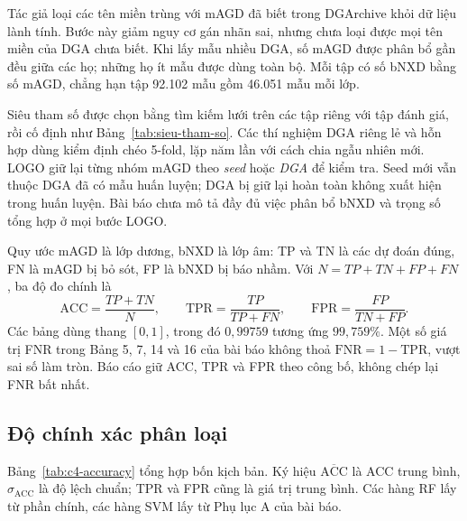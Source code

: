 Tác giả loại các tên miền trùng với mAGD đã biết trong DGArchive khỏi dữ liệu lành tính. Bước này giảm nguy cơ gán nhãn sai, nhưng chưa loại được mọi tên miền của DGA chưa biết. Khi lấy mẫu nhiều DGA, số mAGD được phân bổ gần đều giữa các họ; những họ ít mẫu được dùng toàn bộ. Mỗi tập có số bNXD bằng số mAGD, chẳng hạn tập 92.102 mẫu gồm 46.051 mẫu mỗi lớp.

Siêu tham số được chọn bằng tìm kiếm lưới trên các tập riêng với tập đánh giá, rồi cố định như Bảng~\ref{tab:sieu-tham-so}. Các thí nghiệm DGA riêng lẻ và hỗn hợp dùng kiểm định chéo 5-fold, lặp năm lần với cách chia ngẫu nhiên mới. LOGO giữ lại từng nhóm mAGD theo \emph{seed} hoặc \emph{DGA} để kiểm tra. Seed mới vẫn thuộc DGA đã có mẫu huấn luyện; DGA bị giữ lại hoàn toàn không xuất hiện trong huấn luyện. Bài báo chưa mô tả đầy đủ việc phân bổ bNXD và trọng số tổng hợp ở mọi bước LOGO.

Quy ước mAGD là lớp dương, bNXD là lớp âm: TP và TN là các dự đoán đúng, FN là mAGD bị bỏ sót, FP là bNXD bị báo nhầm. Với $N=TP+TN+FP+FN$, ba độ đo chính là
\begin{equation}\label{eq:c4-acc}
\mathrm{ACC}=\frac{TP+TN}{N},\qquad
\mathrm{TPR}=\frac{TP}{TP+FN},\qquad
\mathrm{FPR}=\frac{FP}{TN+FP}.
\end{equation}
Các bảng dùng thang $[0,1]$, trong đó $0{,}99759$ tương ứng $99{,}759\%$. Một số giá trị FNR trong Bảng 5, 7, 14 và 16 của bài báo không thoả $\mathrm{FNR}=1-\mathrm{TPR}$, vượt sai số làm tròn. Báo cáo giữ ACC, TPR và FPR theo công bố, không chép lại FNR bất nhất.

\subsection{Độ chính xác phân loại}\label{sec:do-chinh-xac}

Bảng~\ref{tab:c4-accuracy} tổng hợp bốn kịch bản. Ký hiệu $\overline{\mathrm{ACC}}$ là ACC trung bình, $\sigma_{\mathrm{ACC}}$ là độ lệch chuẩn; TPR và FPR cũng là giá trị trung bình. Các hàng RF lấy từ phần chính, các hàng SVM lấy từ Phụ lục A của bài báo.

